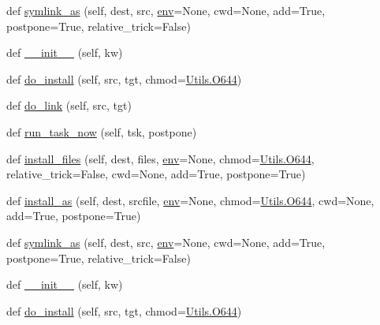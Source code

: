 \begin{DoxyCompactItemize}
\item 
def \hyperlink{classwaflib_1_1_build_1_1_install_context_a25a3977cdde84cb8b06ce8316acc686b}{symlink\+\_\+as} (self, dest, src, \hyperlink{classwaflib_1_1_build_1_1_build_context_ac3b464a969bc6c898c739b6d820b2219}{env}=None, cwd=None, add=True, postpone=True, relative\+\_\+trick=False)
\item 
def \hyperlink{classwaflib_1_1_build_1_1_install_context_a92d1f07459687e8da5a0e871eeb462f0}{\+\_\+\+\_\+init\+\_\+\+\_\+} (self, kw)
\item 
def \hyperlink{classwaflib_1_1_build_1_1_install_context_a389ce541ae521e6e4e616cfddf89bd7e}{do\+\_\+install} (self, src, tgt, chmod=\hyperlink{namespacewaflib_1_1_utils_ade9dd27fadbf52a0641bbff06d3dd3ac}{Utils.\+O644})
\item 
def \hyperlink{classwaflib_1_1_build_1_1_install_context_ac012afc7dd8fb657141d28ad571392f4}{do\+\_\+link} (self, src, tgt)
\item 
def \hyperlink{classwaflib_1_1_build_1_1_install_context_ab9691686f803c54151ec5bbc92717a0f}{run\+\_\+task\+\_\+now} (self, tsk, postpone)
\item 
def \hyperlink{classwaflib_1_1_build_1_1_install_context_af07f1f67998c0f4a6d20361cd28ee0bc}{install\+\_\+files} (self, dest, files, \hyperlink{classwaflib_1_1_build_1_1_build_context_ac3b464a969bc6c898c739b6d820b2219}{env}=None, chmod=\hyperlink{namespacewaflib_1_1_utils_ade9dd27fadbf52a0641bbff06d3dd3ac}{Utils.\+O644}, relative\+\_\+trick=False, cwd=None, add=True, postpone=True)
\item 
def \hyperlink{classwaflib_1_1_build_1_1_install_context_a7a653c97bec879bfd813d525c8c0caf3}{install\+\_\+as} (self, dest, srcfile, \hyperlink{classwaflib_1_1_build_1_1_build_context_ac3b464a969bc6c898c739b6d820b2219}{env}=None, chmod=\hyperlink{namespacewaflib_1_1_utils_ade9dd27fadbf52a0641bbff06d3dd3ac}{Utils.\+O644}, cwd=None, add=True, postpone=True)
\item 
def \hyperlink{classwaflib_1_1_build_1_1_install_context_a25a3977cdde84cb8b06ce8316acc686b}{symlink\+\_\+as} (self, dest, src, \hyperlink{classwaflib_1_1_build_1_1_build_context_ac3b464a969bc6c898c739b6d820b2219}{env}=None, cwd=None, add=True, postpone=True, relative\+\_\+trick=False)
\item 
def \hyperlink{classwaflib_1_1_build_1_1_install_context_a92d1f07459687e8da5a0e871eeb462f0}{\+\_\+\+\_\+init\+\_\+\+\_\+} (self, kw)
\item 
def \hyperlink{classwaflib_1_1_build_1_1_install_context_a389ce541ae521e6e4e616cfddf89bd7e}{do\+\_\+install} (self, src, tgt, chmod=\hyperlink{namespacewaflib_1_1_utils_ade9dd27fadbf52a0641bbff06d3dd3ac}{Utils.\+O644})

\end{DoxyCompactItemize}
